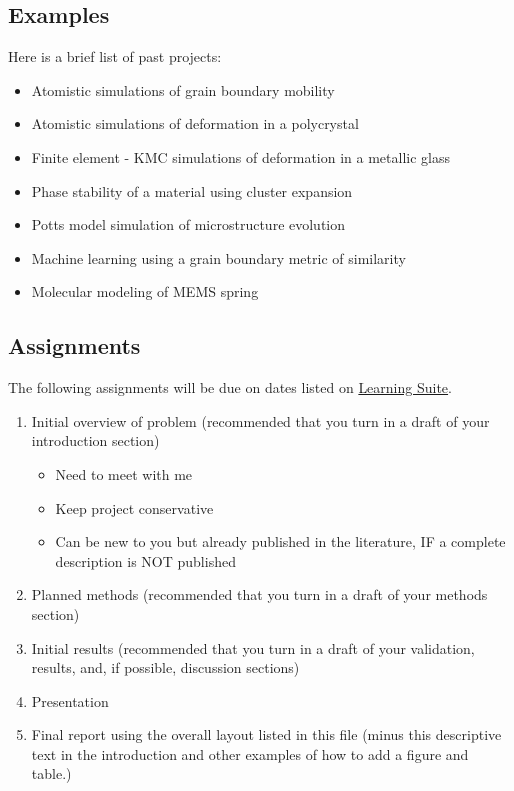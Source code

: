 \documentclass{article}
\begin{document}
\subsection{Examples}
Here is a brief list of past projects:
\begin{itemize}
    \item Atomistic simulations of grain boundary mobility
    \item Atomistic simulations of deformation in a polycrystal
    \item Finite element - KMC simulations of deformation in a metallic glass
    \item Phase stability of a material using cluster expansion
    \item Potts model simulation of microstructure evolution
    \item Machine learning using a grain boundary metric of similarity
    \item Molecular modeling of MEMS spring
\end{itemize}

\subsection{Assignments}
The following assignments will be due on dates listed on \href{https://learningsuite.byu.edu}{Learning Suite}.

\begin{enumerate}
    \item Initial overview of problem (recommended that you turn in a draft of your introduction section)
    \begin{itemize}
        \item Need to meet with me
        \item Keep project conservative
        \item Can be new to you but already published in the literature, IF a complete description is NOT published
    \end{itemize}
    
    \item Planned methods (recommended that you turn in a draft of your methods section)
    \item Initial results (recommended that you turn in a draft of your validation, results, and, if possible, discussion sections)
    \item Presentation
    \item Final report using the overall layout listed in this file (minus this descriptive text in the introduction and other examples of how to add a figure and table.)


\end{enumerate}
\end{document}
